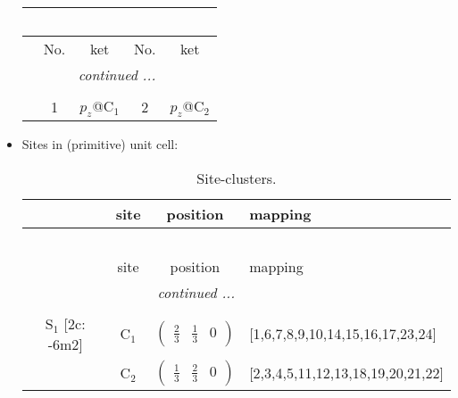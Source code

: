 \documentclass[fleqn,10pt,landscape]{article}
\begin{document}
\begin{itemize}
\begin{center}
\begin{longtable}{c|cc|cc}
\multicolumn{4}{l}{\tablename\ \thetable{}} \\
 \hline \hline
 & No. & ket & No. & ket \\ \hline \endhead

 \hline \hline
\multicolumn{4}{r}{\footnotesize\it continued ...} \\ \endfoot

 \hline \hline
\multicolumn{4}{r}{} \\ \endlastfoot

 & 1 & $p_{z}$@C$_{1}$ & 2 & $p_{z}$@C$_{2}$ \\
\end{longtable}
\end{center}

\item Sites in (primitive) unit cell:
\begin{center}
\renewcommand{\arraystretch}{1.3}
\begin{longtable}{cc|c|l}
\caption{Site-clusters.}
 \\
 \hline \hline
 & site & position & mapping \\ \hline \endfirsthead

\multicolumn{3}{l}{\tablename\ \thetable{}} \\
 \hline \hline
 & site & position & mapping \\ \hline \endhead

 \hline \hline
\multicolumn{3}{r}{\footnotesize\it continued ...} \\ \endfoot

 \hline \hline
\multicolumn{3}{r}{} \\ \endlastfoot

S$_{1}$ [2c: -6m2] & C$_1$ & $\begin{pmatrix} \frac{2}{3} & \frac{1}{3} & 0 \end{pmatrix}$ & [1,6,7,8,9,10,14,15,16,17,23,24] \\
& C$_2$ & $\begin{pmatrix} \frac{1}{3} & \frac{2}{3} & 0 \end{pmatrix}$ & [2,3,4,5,11,12,13,18,19,20,21,22] \\
\end{longtable}
\end{center}


\end{itemize}
\end{document}

